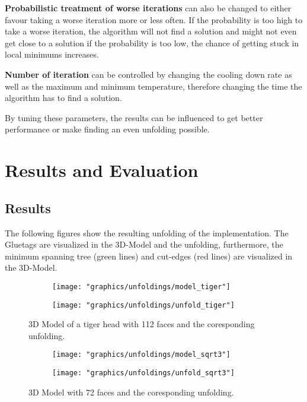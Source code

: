 \documentclass[draft,final]{vutinfth} %
\begin{document}
\textbf{Probabilistic treatment of worse iterations} can also be changed to either favour taking a worse iteration more or less often. If the probability is too high to take a worse iteration, the algorithm will not find a solution and might not even get close to a solution if the probability is too low, the chance of getting stuck in local minimums increases.

\textbf{Number of iteration} can be controlled by changing the cooling down rate as well as the maximum and minimum temperature, therefore changing the time the algorithm has to find a solution.

By tuning these parameters, the results can be influenced to get better performance or make finding an even unfolding possible.

\chapter{Results and Evaluation}
\label{chap:reseval}

\section{Results}
The following figures show the resulting unfolding of the implementation. The Gluetags are visualized in the 3D-Model and the unfolding, furthermore, the minimum spanning tree (green lines) and cut-edges (red lines) are visualized in the 3D-Model.

\begin{figure}
  \begin{subfigure}[b]{0.5\textwidth}
    \texttt{[image: "graphics/unfoldings/model\_tiger"]}
  \end{subfigure}
  \begin{subfigure}[b]{0.5\textwidth}
    \texttt{[image: "graphics/unfoldings/unfold\_tiger"]}
  \end{subfigure}
  
  \caption{3D Model of a tiger head with 112 faces and the coresponding unfolding.}
  \label{fig:tiger}
\end{figure}

\begin{figure}
  \begin{subfigure}[b]{0.5\textwidth}
    \texttt{[image: "graphics/unfoldings/model\_sqrt3"]}
  \end{subfigure}
  \begin{subfigure}[b]{0.5\textwidth}
    \texttt{[image: "graphics/unfoldings/unfold\_sqrt3"]}
  \end{subfigure}
  
  \caption{3D Model with 72 faces and the coresponding unfolding.}
  \label{fig:sqrt3}
\end{figure}
\end{document}
